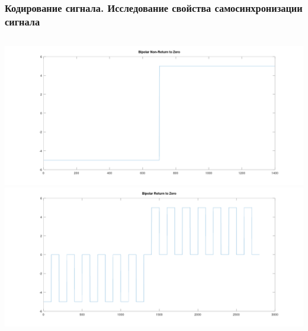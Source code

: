 \begin{frame}
\frametitle{Кодирование сигнала. Исследование свойства самосинхронизации сигнала}
\begin{columns}
            \includegraphics[width=\textwidth]{../octave/coding/sync/bipolarnrz.png}
            \includegraphics[width=\textwidth]{../octave/coding/sync/bipolarrz.png}
\end{columns}
\end{frame}

